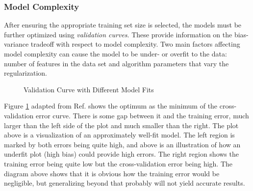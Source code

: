 \subsubsection{Model Complexity}

After ensuring the appropriate training set size is selected, the models must
be further optimized using \textit{validation curves}.  These provide
information on the bias-variance tradeoff with respect to model complexity. Two
main factors affecting model complexity can cause the model to be under- or
overfit to the data: number of features in the data set and algorithm
parameters that vary the regularization.

\begin{figure}[!htb]
  \centering
  \caption{Validation Curve with Different Model Fits}
  \label{fig:validation}
\end{figure}

Figure \ref{fig:validation} adapted from Ref. \cite{elements_stats} shows the
optimum as the minimum of the cross-validation error curve. There is some gap
between it and the training error, much larger than the left side of the plot
and much smaller than the right.  The plot above is a visualization of an
approximately well-fit model.  The left region is marked by both errors being
quite high, and above is an  illustration of how an underfit plot (high bias)
could provide high errors. The right region shows the training error being
quite low but the cross-validation error being high. The diagram above shows
that it is obvious how the training error would be negligible, but generalizing
beyond that probably will not yield accurate results. 

